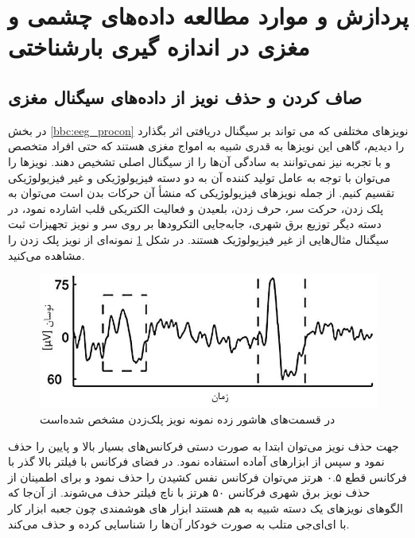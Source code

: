 \section{پردازش و موارد مطالعه داده‌های ‌چشمی و مغزی در اندازه گیری بارشناختی}
\label{s:data}
\subsection{صاف کردن و حذف نویز از داده‌های سیگنال مغزی}
در بخش
\ref{bbc:eeg_procon}
نویزهای مختلفی که می‌ تواند بر سیگنال دریافتی اثر بگذارد را دیدیم، گاهی این نویزها به قدری شبیه به امواج مغزی هستند که حتی افراد متخصص و با تجربه نیز نمی‌توانند به سادگی آن‌ها را از سیگنال اصلی تشخیص دهند. نویزها را می‌توان با توجه به عامل تولید کننده آن به دو دسته فیزیولوژیکی و غیر فیزیولوژیکی تقسیم کنیم. از جمله نویزهای فیزیولوژیکی که منشأ آن حرکات بدن است می‌توان به پلک زدن، حرکت سر، حرف زدن، بلعیدن و فعالیت الکتریکی قلب اشارده نمود، در دسته دیگر توزیع برق شهری، جابه‌جایی التکرودها بر روی سر و نویز تجهیزات ثبت سیگنال مثال‌هایی از غیر فیزیولوژیک هستند.
در شکل 
\ref{fig:eeg-blink-noise}
نمونه‌ای از نویز پلک زدن را مشاهده می‌کنید.
\begin{figure}[h]
	\centering
	\includegraphics[width=0.7\linewidth]{"figures/EEG blink noise"}
	\caption[نویز پلک زدن]{در قسمت‌های هاشور زده نمونه نویز پلک‌زدن مشخص شده‌است}
	\label{fig:eeg-blink-noise}
\end{figure}
جهت حذف نویز می‌توان ابتدا به صورت دستی فرکانس‌های بسیار بالا و پایین را حذف نمود و سپس از ابزار‌های آماده استفاده نمود. در فضای فرکانس با فیلتر بالا گذر
با فرکانس قطع ۰.۵ هرتز مي‌توان فرکانس نفس کشیدن را حذف نمود و برای اطمینان از حذف نویز برق شهری فرکانس ۵۰ هرتز با ناچ فیلتر
حذف می‌شوند. از آن‌جا که الگوهای نویزهای یک دسته شبیه به هم هستند ابزار های هوشمندی چون جعبه ابزار کار با ای‌ای‌جی متلب به صورت خودکار آن‌ها را شناسایی کرده و حذف می‌کند.
